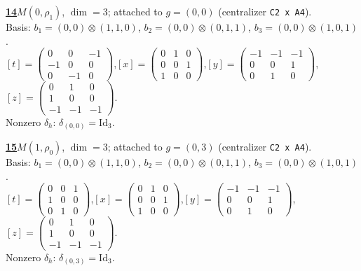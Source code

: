 \begin{samepage}\noindent\textbf{\underline{14}}\quad $M(0,\rho_{1})$, $\dim=3$; attached to $g=(0,0)$ (centralizer \texttt{C2 x A4}).\\
Basis: $b_{1}=(0,0)\otimes (1,1,0)$, $b_{2}=(0,0)\otimes (0,1,1)$, $b_{3}=(0,0)\otimes (1,0,1)$.\\
$[t]=\left(\begin{smallmatrix} 0 & 0 & -1 \\ -1 & 0 & 0 \\ 0 & -1 & 0 \end{smallmatrix}\right)$,\quad $[x]=\left(\begin{smallmatrix} 0 & 1 & 0 \\ 0 & 0 & 1 \\ 1 & 0 & 0 \end{smallmatrix}\right)$,\quad $[y]=\left(\begin{smallmatrix} -1 & -1 & -1 \\ 0 & 0 & 1 \\ 0 & 1 & 0 \end{smallmatrix}\right)$,\quad $[z]=\left(\begin{smallmatrix} 0 & 1 & 0 \\ 1 & 0 & 0 \\ -1 & -1 & -1 \end{smallmatrix}\right)$.\\
Nonzero $\delta_h$: $\delta_{(0,0)}=\mathrm{Id}_{3}$.\end{samepage}
\medskip

\begin{samepage}\noindent\textbf{\underline{15}}\quad $M(1,\rho_{0})$, $\dim=3$; attached to $g=(0,3)$ (centralizer \texttt{C2 x A4}).\\
Basis: $b_{1}=(0,0)\otimes (1,1,0)$, $b_{2}=(0,0)\otimes (0,1,1)$, $b_{3}=(0,0)\otimes (1,0,1)$.\\
$[t]=\left(\begin{smallmatrix} 0 & 0 & 1 \\ 1 & 0 & 0 \\ 0 & 1 & 0 \end{smallmatrix}\right)$,\quad $[x]=\left(\begin{smallmatrix} 0 & 1 & 0 \\ 0 & 0 & 1 \\ 1 & 0 & 0 \end{smallmatrix}\right)$,\quad $[y]=\left(\begin{smallmatrix} -1 & -1 & -1 \\ 0 & 0 & 1 \\ 0 & 1 & 0 \end{smallmatrix}\right)$,\quad $[z]=\left(\begin{smallmatrix} 0 & 1 & 0 \\ 1 & 0 & 0 \\ -1 & -1 & -1 \end{smallmatrix}\right)$.\\
Nonzero $\delta_h$: $\delta_{(0,3)}=\mathrm{Id}_{3}$.\end{samepage}
\medskip

